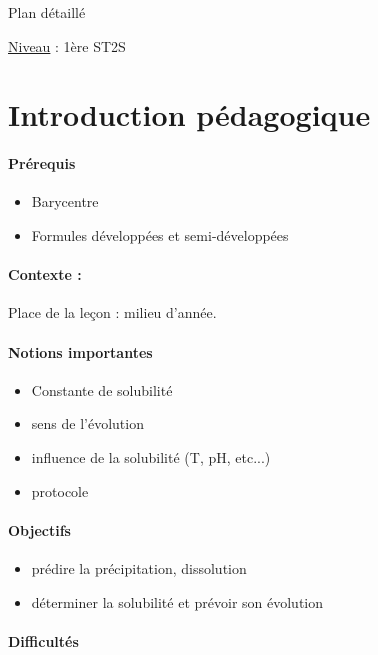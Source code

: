 \begin{reportBlock}{Plan détaillé}

\underline{Niveau} : 1ère ST2S \\

\section*{Introduction pédagogique}


\paragraph*{Prérequis}
\begin{itemize}
\item Barycentre
\item Formules développées et semi-développées
\end{itemize}

\paragraph*{Contexte :}
Place de la leçon : milieu d'année.

\paragraph*{Notions importantes}

\begin{itemize}
\item Constante de solubilité
\item sens de l'évolution
\item influence de la solubilité (T, pH, etc...)
\item protocole 
\end{itemize}

\paragraph*{Objectifs}

\begin{itemize}
\item prédire la précipitation, dissolution
\item déterminer la solubilité et prévoir son évolution
\end{itemize}

\paragraph*{Difficultés}


\end{reportBlock}
